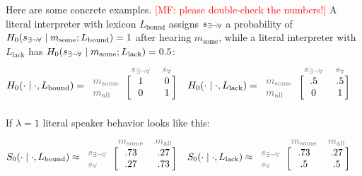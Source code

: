 \documentclass[a4paper, 11pt]{article}
\theoremstyle{Satz}
\newcommand{\mf}[1]{\textcolor{Red}{[MF: #1]}}
\newcommand{\state}{\ensuremath{s}\xspace}		%
\newcommand{\mystate}[1]{\ensuremath{\state_{\text{#1}}}\xspace} %
\newcommand{\mylang}[1]{\ensuremath{L_{\text{#1}}}\xspace} %
\newcommand{\messg}{\ensuremath{m}\xspace}		%
\newcommand{\mymessg}[1]{\ensuremath{\messg_{\text{#1}}}\xspace} %
\newcommand{\ssome}{\mystate{\ensuremath{\exists\neg\forall}}}
\newcommand{\sall}{\mystate{\ensuremath{\forall}}}
\newcommand{\msome}{\mymessg{some}}
\newcommand{\mall}{\mymessg{all}}
\newcommand{\Lbound}{\mylang{bound}}
\newcommand{\Llack}{\mylang{lack}}
\newcommand{\mygray}[1]{{\textcolor{mygray}{#1}}}
\begin{document}
Here are some concrete examples. \mf{please double-check the numbers!} A literal interpreter with lexicon $\Lbound$ assigns $\ssome$
a probability of $H_0(\ssome \mid \msome; \Lbound) = 1$ after hearing $\msome$, while a literal
interpreter with $\Llack$ has $H_0(\ssome \mid \msome; \Llack) = 0.5$:
\begin{align*}
  H_0(\cdot \mid \cdot, \Lbound) & = \begin{blockarray}{lcc}
    & \mygray{\ssome} & \mygray{\sall} \\
    \begin{block}{l[cc]}
      \mygray{\msome} & 1 & 0 \\
      \mygray{\mall}  & 0 & 1 \\
    \end{block}
  \end{blockarray} &
  H_0(\cdot \mid \cdot, \Llack) & = \begin{blockarray}{lcc}
    & \mygray{\ssome} & \mygray{\sall} \\
    \begin{block}{l[cc]}
      \mygray{\msome} & .5 & .5 \\
      \mygray{\mall}  & 0 & 1 \\
    \end{block}
  \end{blockarray} 
\end{align*}
If $\lambda = 1$ literal speaker behavior looks like this:
\begin{align*}
  S_0(\cdot \mid \cdot, \Lbound) & \approx \begin{blockarray}{lcc}
    & \mygray{\msome} & \mygray{\mall} \\
    \begin{block}{l[cc]}
      \mygray{\ssome} & .73 & .27 \\
      \mygray{\sall}  & .27 & .73 \\
    \end{block}
  \end{blockarray} &
  S_0(\cdot \mid \cdot, \Llack) & \approx \begin{blockarray}{lcc}
    & \mygray{\msome} & \mygray{\mall} \\
    \begin{block}{l[cc]}
      \mygray{\ssome} & .73 & .27 \\
      \mygray{\sall}  & .5 & .5 \\
    \end{block}
  \end{blockarray} 
\end{align*}
\end{document}
